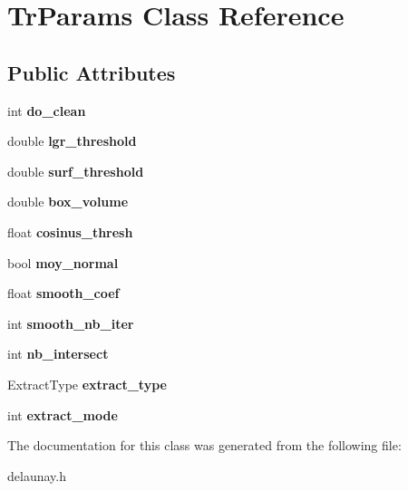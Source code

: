 \hypertarget{class_tr_params}{
\section{TrParams Class Reference}
\label{class_tr_params}
}
\subsection*{Public Attributes}
\begin{DoxyCompactItemize}
\item 
\hypertarget{class_tr_params_a6e6a459aef7cb1acd82415279855aaa1}{
int {\bfseries do\_\-clean}}
\label{class_tr_params_a6e6a459aef7cb1acd82415279855aaa1}

\item 
\hypertarget{class_tr_params_a72377e94872cb7e3ec1bc7936d51dfda}{
double {\bfseries lgr\_\-threshold}}
\label{class_tr_params_a72377e94872cb7e3ec1bc7936d51dfda}

\item 
\hypertarget{class_tr_params_a3c2580990cc2a87aa9fb1d8f495eae84}{
double {\bfseries surf\_\-threshold}}
\label{class_tr_params_a3c2580990cc2a87aa9fb1d8f495eae84}

\item 
\hypertarget{class_tr_params_aa46363c0bd4ba7d1da7802c37cfb210d}{
double {\bfseries box\_\-volume}}
\label{class_tr_params_aa46363c0bd4ba7d1da7802c37cfb210d}

\item 
\hypertarget{class_tr_params_a91f70ade0efc499e3d55bfb2143d35c6}{
float {\bfseries cosinus\_\-thresh}}
\label{class_tr_params_a91f70ade0efc499e3d55bfb2143d35c6}

\item 
\hypertarget{class_tr_params_a2ba40154349c0c124ca933439d0575b3}{
bool {\bfseries moy\_\-normal}}
\label{class_tr_params_a2ba40154349c0c124ca933439d0575b3}

\item 
\hypertarget{class_tr_params_ab950f91fef639ad760b8c6911a36536c}{
float {\bfseries smooth\_\-coef}}
\label{class_tr_params_ab950f91fef639ad760b8c6911a36536c}

\item 
\hypertarget{class_tr_params_a404d1c301dd761f928c4b3688efa90c2}{
int {\bfseries smooth\_\-nb\_\-iter}}
\label{class_tr_params_a404d1c301dd761f928c4b3688efa90c2}

\item 
\hypertarget{class_tr_params_a6de5f7c969a55b7c9301177c2e38537d}{
int {\bfseries nb\_\-intersect}}
\label{class_tr_params_a6de5f7c969a55b7c9301177c2e38537d}

\item 
\hypertarget{class_tr_params_a98a3411069cffa301444b893523d9c5c}{
ExtractType {\bfseries extract\_\-type}}
\label{class_tr_params_a98a3411069cffa301444b893523d9c5c}

\item 
\hypertarget{class_tr_params_acf38c074b1af80dba366076f73d22f29}{
int {\bfseries extract\_\-mode}}
\label{class_tr_params_acf38c074b1af80dba366076f73d22f29}

\end{DoxyCompactItemize}


The documentation for this class was generated from the following file:\begin{DoxyCompactItemize}
\item 
delaunay.h\end{DoxyCompactItemize}
